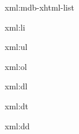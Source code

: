 
\startxmlsetups xml:mdb-xhtml-list
\stopxmlsetups


\startxmlsetups xml:li
	\item
\stopxmlsetups

\startxmlsetups xml:ul
	\startitemize
	\stopitemize
\stopxmlsetups

\startxmlsetups xml:ol
	\startitemize[n]
	\stopitemize
\stopxmlsetups


\startxmlsetups xml:dl
	\par
\stopxmlsetups

\startxmlsetups xml:dt
	\crlf
\stopxmlsetups

\startxmlsetups xml:dd
	\startnarrower
	\stopnarrower
\stopxmlsetups

